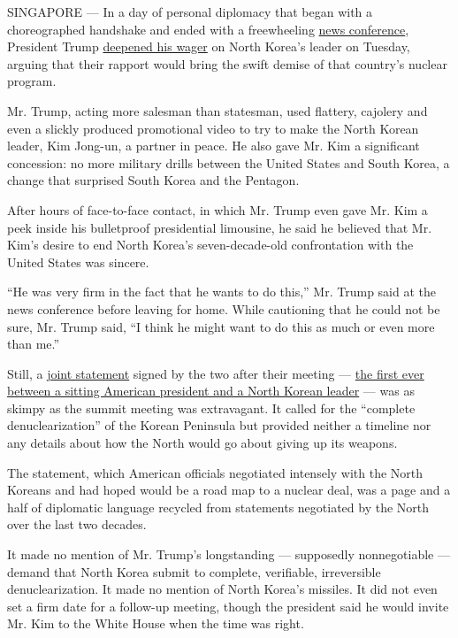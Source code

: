 SINGAPORE --- In a day of personal diplomacy that began with a
choreographed handshake and ended with a freewheeling
\href{https://www.nytimes.com/2018/06/12/world/asia/trump-summit-transcript.html}{news
conference}, President Trump
\href{https://www.nytimes.com/2018/06/12/world/asia/trump-kim-policy.html}{deepened
his wager} on North Korea's leader on Tuesday, arguing that their
rapport would bring the swift demise of that country's nuclear program.

Mr. Trump, acting more salesman than statesman, used flattery, cajolery
and even a slickly produced promotional video to try to make the North
Korean leader, Kim Jong-un, a partner in peace. He also gave Mr. Kim a
significant concession: no more military drills between the United
States and South Korea, a change that surprised South Korea and the
Pentagon.

After hours of face-to-face contact, in which Mr. Trump even gave Mr.
Kim a peek inside his bulletproof presidential limousine, he said he
believed that Mr. Kim's desire to end North Korea's seven-decade-old
confrontation with the United States was sincere.

``He was very firm in the fact that he wants to do this,'' Mr. Trump
said at the news conference before leaving for home. While cautioning
that he could not be sure, Mr. Trump said, ``I think he might want to do
this as much or even more than me.''

Still, a
\href{https://www.nytimes.com/2018/06/12/world/asia/trump-kim-summit-statement.html}{joint
statement} signed by the two after their meeting ---
\href{https://www.nytimes.com/2018/06/11/world/asia/trump-kim-summitmeeting.html}{the
first ever between a sitting American president and a North Korean
leader} --- was as skimpy as the summit meeting was extravagant. It
called for the ``complete denuclearization'' of the Korean Peninsula but
provided neither a timeline nor any details about how the North would go
about giving up its weapons.

The statement, which American officials negotiated intensely with the
North Koreans and had hoped would be a road map to a nuclear deal, was a
page and a half of diplomatic language recycled from statements
negotiated by the North over the last two decades.

It made no mention of Mr. Trump's longstanding --- supposedly
nonnegotiable --- demand that North Korea submit to complete,
verifiable, irreversible denuclearization. It made no mention of North
Korea's missiles. It did not even set a firm date for a follow-up
meeting, though the president said he would invite Mr. Kim to the White
House when the time was right.

